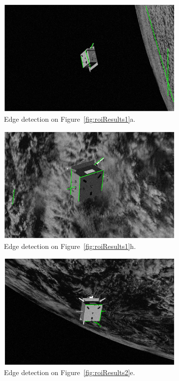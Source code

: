\begin{figure}[htpb]
  \centering
  \includegraphics[width=0.82\textwidth]{gfx/results/prisma/101/15.png}
  \caption{Edge detection on Figure~\ref{fig:roiResults1}a.}
  \label{fig:edgeDetection101}
\end{figure}

\begin{figure}[htpb]
  \centering
  \includegraphics[width=0.82\textwidth]{gfx/results/prisma/117/15.png}
  \caption{Edge detection on Figure~\ref{fig:roiResults1}h.}
  \label{fig:edgeDetection117}
\end{figure}

\begin{figure}[htpb]
  \centering
  \includegraphics[width=0.82\textwidth]{gfx/results/prisma/164/15.png}
  \caption{Edge detection on Figure~\ref{fig:roiResults2}e.}
  \label{fig:edgeDetection164}
\end{figure}

